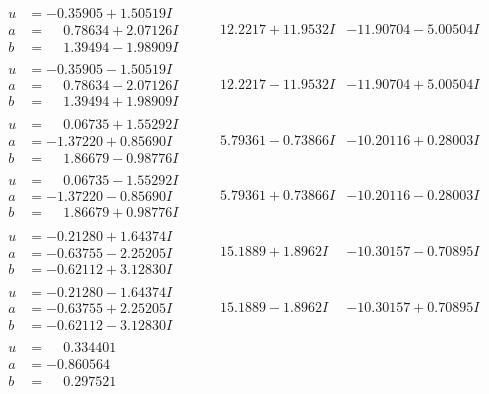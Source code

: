 \documentclass[1p]{elsarticle_modified}
\theoremstyle{definition}
\begin{document}
$$\begin{array}{c|c|c}
\begin{aligned}
u &= -0.35905 + 1.50519 I \\
a &= \phantom{-}0.78634 + 2.07126 I \\
b &= \phantom{-}1.39494 - 1.98909 I\end{aligned}
 & \phantom{-}12.2217 + 11.9532 I & -11.90704 - 5.00504 I \\ \hline\begin{aligned}
u &= -0.35905 - 1.50519 I \\
a &= \phantom{-}0.78634 - 2.07126 I \\
b &= \phantom{-}1.39494 + 1.98909 I\end{aligned}
 & \phantom{-}12.2217 - 11.9532 I & -11.90704 + 5.00504 I \\ \hline\begin{aligned}
u &= \phantom{-}0.06735 + 1.55292 I \\
a &= -1.37220 + 0.85690 I \\
b &= \phantom{-}1.86679 - 0.98776 I\end{aligned}
 & \phantom{-}5.79361 - 0.73866 I & -10.20116 + 0.28003 I \\ \hline\begin{aligned}
u &= \phantom{-}0.06735 - 1.55292 I \\
a &= -1.37220 - 0.85690 I \\
b &= \phantom{-}1.86679 + 0.98776 I\end{aligned}
 & \phantom{-}5.79361 + 0.73866 I & -10.20116 - 0.28003 I \\ \hline\begin{aligned}
u &= -0.21280 + 1.64374 I \\
a &= -0.63755 - 2.25205 I \\
b &= -0.62112 + 3.12830 I\end{aligned}
 & \phantom{-}15.1889 + 1.8962 I & -10.30157 - 0.70895 I \\ \hline\begin{aligned}
u &= -0.21280 - 1.64374 I \\
a &= -0.63755 + 2.25205 I \\
b &= -0.62112 - 3.12830 I\end{aligned}
 & \phantom{-}15.1889 - 1.8962 I & -10.30157 + 0.70895 I \\ \hline\begin{aligned}
u &= \phantom{-}0.334401\phantom{ +0.000000I} \\
a &= -0.860564\phantom{ +0.000000I} \\
b &= \phantom{-}0.297521\phantom{ +0.000000I}\end{aligned}

\end{array}$$
\end{document}

